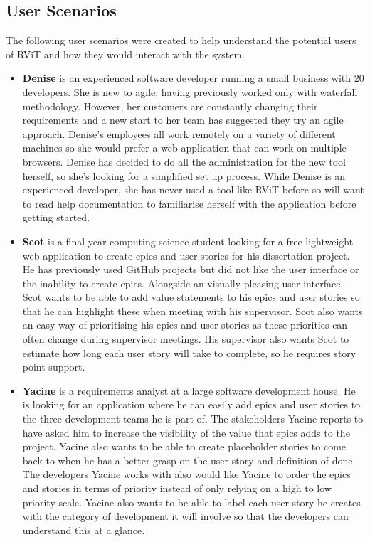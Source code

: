 \documentclass[l4proj.tex]{subfiles}
\begin{document}
\subsection{User Scenarios}
The following user scenarios were created to help understand the potential users of RViT and how they would interact with the system.
\begin{itemize}
    \item \textbf{Denise} is an experienced software developer running a small business with 20 developers. She is new to agile, having previously worked only with waterfall methodology. However, her customers are constantly changing their requirements and a new start to her team has suggested they try an agile approach. Denise's employees all work remotely on a variety of different machines so she would prefer a web application that can work on multiple browsers. Denise has decided to do all the administration for the new tool herself, so she's looking for a simplified set up process. While Denise is an experienced developer, she has never used a tool like RViT before so will want to read help documentation to familiarise herself with the application before getting started.\\
    
    \item  \textbf{Scot} is a final year computing science student looking for a free lightweight web application to create epics and user stories for his dissertation project. He has previously used GitHub projects but did not like the user interface or the inability to create epics. Alongside an visually-pleasing  user interface, Scot wants to be able to add value statements to his epics and user stories so that he can highlight these when meeting with his supervisor. Scot also wants an easy way of prioritising his epics and user stories as these priorities can often change during supervisor meetings. His supervisor also wants Scot to estimate how long each user story will take to complete, so he requires story point support.\\

    \item \textbf{Yacine} is a requirements analyst at a large software development house. He is looking for an application where he can easily add epics and user stories to the three development teams he is part of. The stakeholders Yacine reports to have asked him to increase the visibility of the value that epics adds to the project. Yacine also wants to be able to create placeholder stories to come back to when he has a better grasp on the user story and definition of done. The developers Yacine works with also would like Yacine to order the epics and stories in terms of priority instead of only relying on a high to low priority scale. Yacine also wants to be able to label each user story he creates with the category of development it will involve so that the developers can understand this at a glance. \\


\end{itemize}
\end{document}

